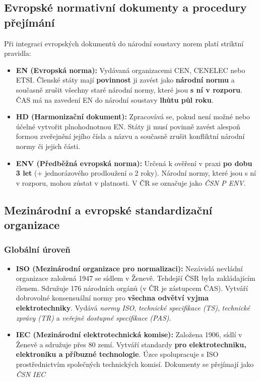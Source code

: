 \documentclass[10pt,a4paper]{article}
\begin{document}
	\subsection{Evropské normativní dokumenty a procedury přejímání}
	Při integraci evropských dokumentů do národní soustavy norem platí striktní pravidla:
	\begin{itemize}
		\item \textbf{EN (Evropská norma):} 
		Vydávaná organizacemi CEN, CENELEC nebo ETSI. 
		Členské státy mají \textbf{povinnost} ji zavést jako \textbf{národní normu} a současně zrušit všechny staré národní normy, které jsou \textbf{s ní v rozporu}. 
		ČAS má na zavedení EN do národní soustavy \textbf{lhůtu půl roku}.
		
		\item \textbf{HD (Harmonizační dokument):} 
		Zpracovává se, pokud není možné nebo účelné vytvořit plnohodnotnou EN. 
		Státy ji musí povinně zavést alespoň formou zveřejnění jejího čísla a názvu a současně zrušit konfliktní národní normy či jejich části.
		
		\item \textbf{ENV (Předběžná evropská norma):} 
		Určená k ověření v praxi \textbf{po dobu 3 let} (+ jednorázového prodloužení o 2 roky). Národní normy, které jsou s ní v rozporu, mohou zůstat v platnosti. V ČR se označuje jako \textit{ČSN P ENV}.
	\end{itemize}
			
	\subsection{Mezinárodní a evropské standardizační organizace}
	
	\subsubsection*{Globální úroveň}
	\begin{itemize}
		\item \textbf{ISO (Mezinárodní organizace pro normalizaci):} 
		Nezávislá nevládní organizace založená 1947 se sídlem v Ženevě. 
		Tehdejší ČSR byla zakládajícím členem. Sdružuje 176 národních orgánů (v ČR je zástupcem ČAS).
		Vytváří dobrovolné konsensuální normy pro \textbf{všechna odvětví vyjma elektrotechniky}. 
		Vydává \textit{normy ISO}, \textit{technické specifikace (TS)}, \textit{technické zprávy (TR)} a \textit{veřejně dostupné specifikace (PAS)}.
		
		\item \textbf{IEC (Mezinárodní elektrotechnická komise):} 
		Založena 1906, sídlí v Ženevě a sdružuje přes 80 zemí. 
		Vytváří standardy \textbf{pro elektrotechniku, elektroniku a příbuzné technologie}. 
		Úzce spolupracuje s ISO prostřednictvím společných technických komisí. Dokumenty se přejímají jako \textit{ČSN IEC}
	\end{itemize}
				
\end{document}
